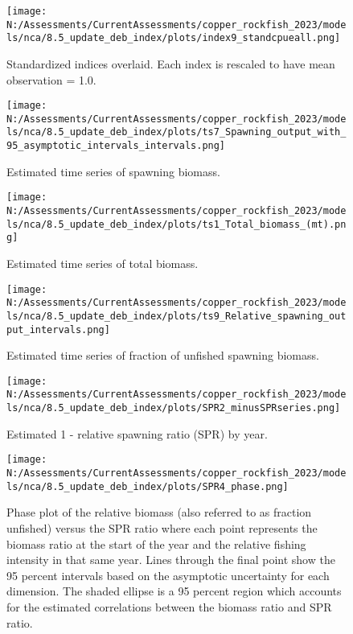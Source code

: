 \documentclass[11pt,
  english,
  letterpaper,
]{article}
\begin{document}
\begin{figure}
\centering
\texttt{[image: N:/Assessments/CurrentAssessments/copper\_rockfish\_2023/models/nca/8.5\_update\_deb\_index/plots/index9\_standcpueall.png]}
\caption{Standardized indices overlaid. Each index is rescaled to have mean observation = 1.0.\label{fig:standardized-indices}}
\end{figure}

\begin{figure}
\centering
\texttt{[image: N:/Assessments/CurrentAssessments/copper\_rockfish\_2023/models/nca/8.5\_update\_deb\_index/plots/ts7\_Spawning\_output\_with\_95\_asymptotic\_intervals\_intervals.png]}
\caption{Estimated time series of spawning biomass.\label{fig:ssb}}
\end{figure}

\begin{figure}
\centering
\texttt{[image: N:/Assessments/CurrentAssessments/copper\_rockfish\_2023/models/nca/8.5\_update\_deb\_index/plots/ts1\_Total\_biomass\_(mt).png]}
\caption{Estimated time series of total biomass.\label{fig:tot-bio}}
\end{figure}

\begin{figure}
\centering
\texttt{[image: N:/Assessments/CurrentAssessments/copper\_rockfish\_2023/models/nca/8.5\_update\_deb\_index/plots/ts9\_Relative\_spawning\_output\_intervals.png]}
\caption{Estimated time series of fraction of unfished spawning biomass.\label{fig:depl}}
\end{figure}

\begin{figure}
\centering
\texttt{[image: N:/Assessments/CurrentAssessments/copper\_rockfish\_2023/models/nca/8.5\_update\_deb\_index/plots/SPR2\_minusSPRseries.png]}
\caption{Estimated 1 - relative spawning ratio (SPR) by year.\label{fig:1-spr}}
\end{figure}

\clearpage

\begin{figure}
\centering
\texttt{[image: N:/Assessments/CurrentAssessments/copper\_rockfish\_2023/models/nca/8.5\_update\_deb\_index/plots/SPR4\_phase.png]}
\caption{Phase plot of the relative biomass (also referred to as fraction unfished) versus the SPR ratio where each point represents the biomass ratio at the start of the year and the relative fishing intensity in that same year. Lines through the final point show the 95 percent intervals based on the asymptotic uncertainty for each dimension. The shaded ellipse is a 95 percent region which accounts for the estimated correlations between the biomass ratio and SPR ratio.\label{fig:phase}}
\end{figure}
\end{document}

